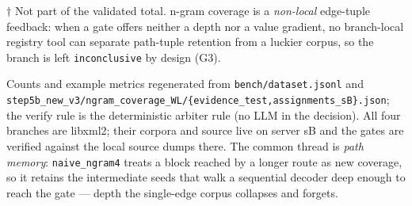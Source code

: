 \documentclass[11pt]{article}
\begin{document}
\noindent\footnotesize $\dagger$ Not part of the validated total. n-gram coverage
is a \emph{non-local} edge-tuple feedback: when a gate offers neither a depth nor a
value gradient, no branch-local registry tool can separate path-tuple retention
from a luckier corpus, so the branch is left \texttt{inconclusive} by design (G3).

\medskip\noindent\footnotesize Counts and example metrics regenerated from
\texttt{bench/dataset.jsonl} and
\texttt{step5b\_new\_v3/ngram\_coverage\_WL/\{evidence\_test,assignments\_sB\}.json};
the verify rule is the deterministic arbiter rule (no LLM in the decision). All
four branches are libxml2; their corpora and source live on server sB and the
gates are verified against the local source dumps there. The common thread is
\emph{path memory}: \texttt{naive\_ngram4} treats a block reached by a longer route
as new coverage, so it retains the intermediate seeds that walk a sequential
decoder deep enough to reach the gate --- depth the single-edge corpus collapses
and forgets.
\end{document}
